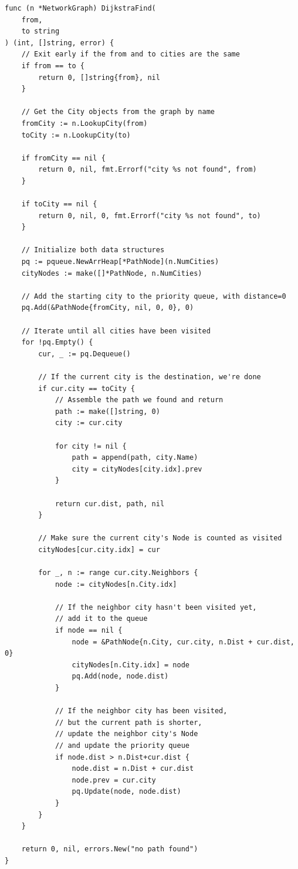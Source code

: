 \documentclass[a4paper,11pt]{article}
\begin{document}
    \begin{verbatim}
func (n *NetworkGraph) DijkstraFind(
    from,
    to string
) (int, []string, error) {
    // Exit early if the from and to cities are the same
    if from == to {
        return 0, []string{from}, nil
    }

    // Get the City objects from the graph by name
    fromCity := n.LookupCity(from)
    toCity := n.LookupCity(to)

    if fromCity == nil {
        return 0, nil, fmt.Errorf("city %s not found", from)
    }

    if toCity == nil {
        return 0, nil, 0, fmt.Errorf("city %s not found", to)
    }

    // Initialize both data structures
    pq := pqueue.NewArrHeap[*PathNode](n.NumCities)
    cityNodes := make([]*PathNode, n.NumCities)

    // Add the starting city to the priority queue, with distance=0
    pq.Add(&PathNode{fromCity, nil, 0, 0}, 0)

    // Iterate until all cities have been visited
    for !pq.Empty() {
        cur, _ := pq.Dequeue()

        // If the current city is the destination, we're done
        if cur.city == toCity {
            // Assemble the path we found and return
            path := make([]string, 0)
            city := cur.city

            for city != nil {
                path = append(path, city.Name)
                city = cityNodes[city.idx].prev
            }

            return cur.dist, path, nil
        }

        // Make sure the current city's Node is counted as visited
        cityNodes[cur.city.idx] = cur

        for _, n := range cur.city.Neighbors {
            node := cityNodes[n.City.idx]

            // If the neighbor city hasn't been visited yet,
            // add it to the queue
            if node == nil {
                node = &PathNode{n.City, cur.city, n.Dist + cur.dist, 0}
                cityNodes[n.City.idx] = node
                pq.Add(node, node.dist)
            }

            // If the neighbor city has been visited,
            // but the current path is shorter,
            // update the neighbor city's Node
            // and update the priority queue
            if node.dist > n.Dist+cur.dist {
                node.dist = n.Dist + cur.dist
                node.prev = cur.city
                pq.Update(node, node.dist)
            }
        }
    }

    return 0, nil, errors.New("no path found")
}
    \end{verbatim}
\end{document}
